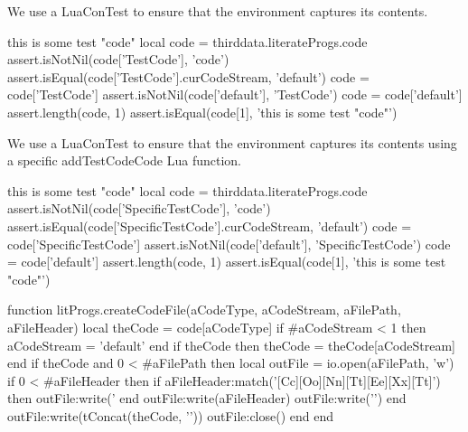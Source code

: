 
We use a LuaConTest to ensure that the  environment 
captures its contents. 

\startConTest
\begingroup
  \startTestCode
    this is some test "code"
  \stopTestCode
  \startLuaConTest
    local code = thirddata.literateProgs.code
    assert.isNotNil(code['TestCode'], 'code')
    assert.isEqual(code['TestCode'].curCodeStream, 'default')
    code = code['TestCode']
    assert.isNotNil(code['default'], 'TestCode')
    code = code['default']
    assert.length(code, 1)
    assert.isEqual(code[1], 'this is some test "code"')
  \stopLuaConTest
\endgroup
\stopConTest
\stopTestCase


We use a LuaConTest to ensure that the  environment 
captures its contents using a specific addTestCodeCode Lua function. 

\startConTest
\begingroup
  \startTestCode
    this is some test "code"
  \stopTestCode
  \startLuaConTest
    local code = thirddata.literateProgs.code
    assert.isNotNil(code['SpecificTestCode'], 'code')
    assert.isEqual(code['SpecificTestCode'].curCodeStream, 'default')
    code = code['SpecificTestCode']
    assert.isNotNil(code['default'], 'SpecificTestCode')
    code = code['default']
    assert.length(code, 1)
    assert.isEqual(code[1], 'this is some test "code"')
  \stopLuaConTest
\endgroup
\stopConTest
\stopTestCase

\startLuaCode
function litProgs.createCodeFile(aCodeType,
                                 aCodeStream,
                                 aFilePath,
                                 aFileHeader)
  local theCode = code[aCodeType]
  if #aCodeStream < 1 then aCodeStream = 'default' end
  if theCode then theCode = theCode[aCodeStream] end
  if theCode and 0 < #aFilePath then
    local outFile = io.open(aFilePath, 'w')
    if 0 < #aFileHeader then
      if aFileHeader:match('[Cc][Oo][Nn][Tt][Ee][Xx][Tt]') then
        outFile:write('%
      end
      outFile:write(aFileHeader)
      outFile:write('\n\n')
    end
    outFile:write(tConcat(theCode, '\n\n'))
    outFile:close()
  end
end
\stopLuaCode

